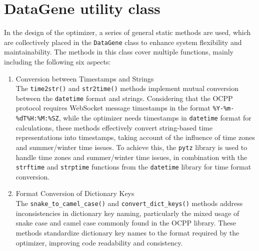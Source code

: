 \documentclass[
english,
ruledheaders=section,%
class=report,%
thesis={type=Report},%
accentcolor=9c,%
custommargins=true,%
marginpar=false,%
parskip=half-,%
fontsize=11pt,%
logofile={img/tuda_logo.pdf}, %
]{tudapub}
\begin{document}
    \section{DataGene utility class}
    \label{sec:DataGene}
    In the design of the optimizer, a series of general static methods are used, which are collectively placed in the \texttt{DataGene} class to enhance system flexibility and maintainability. The methods in this class cover multiple functions, mainly including the following six aspects:
    \begin{enumerate}

        \item Conversion between Timestamps and Strings\\
        The \texttt{time2str()} and \texttt{str2time()} methods implement mutual conversion between the \texttt{datetime} format and strings. Considering that the OCPP protocol requires WebSocket message timestamps in the format \texttt{\%Y-\%m-\%dT\%H:\%M:\%SZ}, while the optimizer needs timestamps in \texttt{datetime} format for calculations, these methods effectively convert string-based time representations into timestamps, taking account of the influence of time zones and summer/winter time issues. To achieve this, the \texttt{pytz} library is used to handle time zones and summer/winter time issues, in combination with the \texttt{strftime} and \texttt{strptime} functions from the \texttt{datetime} library for time format conversion.



        \item Format Conversion of Dictionary Keys\\
        The \texttt{snake\_to\_camel\_case()} and \texttt{convert\_dict\_keys()} methods address inconsistencies in dictionary key naming, particularly the mixed usage of snake case and camel case commonly found in the OCPP library. These methods standardize dictionary key names to the format required by the optimizer, improving code readability and consistency.



\end{enumerate}
\end{document}

